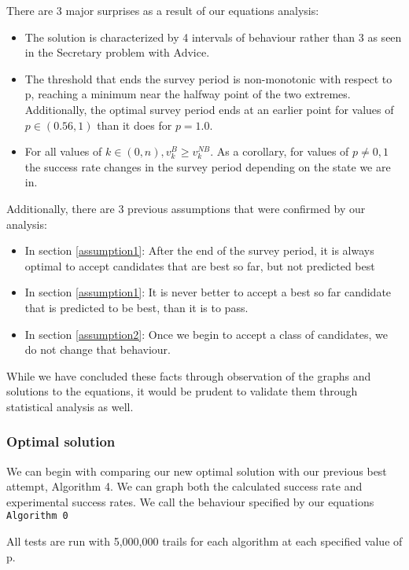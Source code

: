 \documentclass[a4paper,11pt]{article}
\begin{document}
There are 3 major surprises as a result of our equations analysis:

\begin{itemize}
    \item The solution is characterized by 4 intervals of behaviour rather than 3 as seen in the Secretary problem with Advice.
    \item The threshold that ends the survey period is non-monotonic with respect to p, reaching a minimum near the halfway point of the two extremes. Additionally, the optimal survey period ends at an earlier point for values of $p \in (0.56,1)$ than it does for $p=1.0$.
    \item For all values of $k \in (0,n), v^B_k\ge v^{NB}_k$. As a corollary, for values of $p \ne 0, 1$ the success rate changes in the survey period depending on the state we are in.
\end{itemize}

Additionally, there are 3 previous assumptions that were confirmed by our analysis:

\begin{itemize}
    \item In section \ref{assumption1}: After the end of the survey period, it is always optimal to accept candidates that are best so far, but not predicted best
    \item In section \ref{assumption1}: It is never better to accept a best so far candidate that is predicted to be best, than it is to pass.
    \item In section \ref{assumption2}: Once we begin to accept a class of candidates, we do not change that behaviour.
\end{itemize}

While we have concluded these facts through observation of the graphs and solutions to the equations, it would be prudent to validate them through statistical analysis as well.

\subsubsection{Optimal solution}

We can begin with comparing our new optimal solution with our previous best attempt, Algorithm 4. We can graph both the calculated success rate and experimental success rates. We call the behaviour specified by our equations \verb|Algorithm 0|

All tests are run with 5,000,000 trails for each algorithm at each specified value of p. 
\end{document}
